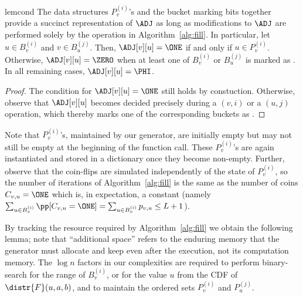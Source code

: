 \begin{restatable}{lem}{cond}\label{lem:cond-0-fill}
The data structures $P_v^{(i)}$'s and the bucket marking bits together provide a succinct representation of $\ADJ$ as long as modifications to $\ADJ$ are performed solely by the  operation in Algorithm~\ref{alg:fill}. In particular, let $u \in B_v^{(i)}$ and $v \in B_u^{(j)}$. Then, $\ADJ[v][u]=\ONE$ if and only if $u \in P_v^{(i)}$. Otherwise, $\ADJ[v][u]=\ZERO$ when at least one of $B_v^{(i)}$ or $B_u^{(j)}$ is marked as \filled. In all remaining cases, $\ADJ[v][u]=\PHI$.
\end{restatable}
\begin{proof}
The condition for $\ADJ[v][u]=\ONE$ still holds by constuction. Otherwise, observe that $\ADJ[v][u]$ becomes decided precisely during a $(v,i)$ or a $(u,j)$ operation, which thereby marks one of the corresponding buckets as \filled.
\end{proof}


Note that $P_v^{(i)}$'s, maintained by our generator, are initially empty but may not still be empty at the beginning of the  function call. These $P_v^{(i)}$'s are again instantiated and stored in a dictionary once they become non-empty.
Further, observe that the coin-flips are simulated independently of the state of $P_v^{(i)}$, so the number of iterations of Algorithm~\ref{alg:fill} is the same as the number of coins $C_{v,u} = \ONE$ which is, in expectation, a constant (namely $\sum_{u\in B_v^{(i)}} \pp[C_{v,u}=\ONE] = \sum_{u\in B_v^{(i)}} p_{v,u} \leq L+1$). %



By tracking the resource required by Algorithm~\ref{alg:fill} we obtain the following lemma; note that ``additional space'' refers to the enduring memory that the generator must allocate and keep even after the execution, not its computation memory. The $\log n$ factors in our complexities are required to perform binary-search for the range of $B_v^{(i)}$, or for the value $u$ from the CDF of $\distr{F}(u,a,b)$, and to maintain the ordered sets $P_v^{(i)}$ and $P_u^{(j)}$.

